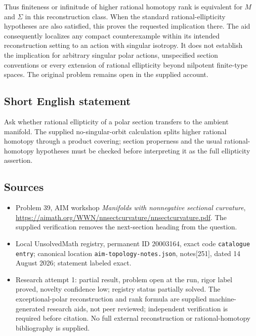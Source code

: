 \documentclass[11pt]{article}
\begin{document}
Thus finiteness or infinitude of higher rational homotopy rank is equivalent for \(M\) and \(\Sigma\) in this reconstruction class. When the standard rational-ellipticity hypotheses are also satisfied, this proves the requested implication there. The aid consequently localizes any compact counterexample within its intended reconstruction setting to an action with singular isotropy. It does not establish the implication for arbitrary singular polar actions, unspecified section conventions or every extension of rational ellipticity beyond nilpotent finite-type spaces. The original problem remains open in the supplied account.
\subsection{Short English statement}
Ask whether rational ellipticity of a polar section transfers to the ambient manifold. The supplied no-singular-orbit calculation splits higher rational homotopy through a product covering; section properness and the usual rational-homotopy hypotheses must be checked before interpreting it as the full ellipticity assertion.
\subsection{Sources}
\begin{itemize}
\item Problem 39, AIM workshop \emph{Manifolds with nonnegative sectional curvature}, \url{https://aimath.org/WWN/nnsectcurvature/nnsectcurvature.pdf}. The supplied verification removes the next-section heading from the question.
\item Local UnsolvedMath registry, permanent ID 20003164, exact code \texttt{catalogue entry}; canonical location \texttt{aim-topology-notes.json}, notes[251], dated 14 August 2026; statement labeled exact.
\item Research attempt 1: partial result, problem open at the run, rigor label proved, novelty confidence low; registry status partially solved. The exceptional-polar reconstruction and rank formula are supplied machine-generated research aids, not peer reviewed; independent verification is required before citation. No full external reconstruction or rational-homotopy bibliography is supplied.
\end{itemize}
\end{document}
